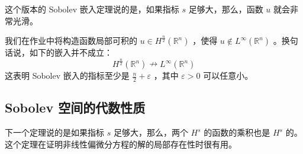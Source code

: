 \begin{remark}
这个版本的 Sobolev 嵌入定理说的是，如果指标 $s$ 足够大，那么，函数 $u$ 就会非常光滑。
\end{remark}
\begin{remark}
我们在作业中将构造函数局部可积的 $u \in H^{\frac{n}{2}}\left(\mathbb{R}^n\right)$ ，使得 $u \notin L^{\infty}\left(\mathbb{R}^n\right)$ 。换句话说，如下的嵌入并不成立：
\[
H^{\frac{n}{2}}\left(\mathbb{R}^n\right) \nrightarrow L^{\infty}\left(\mathbb{R}^n\right)
\]这表明 Sobolev 嵌入的指标至少是 $\frac{n}{2}+\varepsilon$ ，其中 $\varepsilon>0$ 可以任意小。
\end{remark}
\subsection{Sobolev 空间的代数性质}

下一个定理说的是如果指标 $s$ 足够大，那么，两个 $H^s$ 的函数的乘积也是 $H^s$ 的。这个定理在证明非线性偏微分方程的解的局部存在性时很有用。

